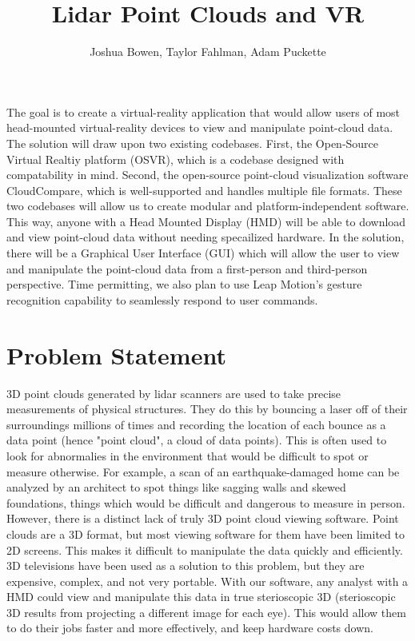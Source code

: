 \documentclass{article}
\begin{document}
\title{Lidar Point Clouds and VR}
\author{Joshua Bowen, Taylor Fahlman, Adam Puckette}

\maketitle

\abstract

The goal is to create a virtual-reality application that would allow users of most head-mounted virtual-reality devices to view and manipulate point-cloud data. The solution will draw upon two existing codebases. First, the Open-Source Virtual Realtiy platform (OSVR), which is a codebase designed with compatability in mind. Second, the open-source point-cloud visualization software CloudCompare, which is well-supported and handles multiple file formats. These two codebases will allow us to create modular and platform-independent software. This way, anyone with a Head Mounted Display (HMD) will be able to download and view point-cloud data without needing specailized hardware. In the solution, there will be a Graphical User Interface (GUI) which will allow the user to view and manipulate the point-cloud data from a first-person and third-person perspective. Time permitting, we also plan to use Leap Motion's gesture recognition capability to seamlessly respond to user commands.

\vfill
\section*{Problem Statement}

3D point clouds generated by lidar scanners are used to take precise measurements of physical structures. They do this by bouncing a laser off of their surroundings millions of times and recording the location of each bounce as a data point (hence "point cloud", a cloud of data points). This is often used to look for abnormalies in the environment that would be difficult to spot or measure otherwise. For example, a scan of an earthquake-damaged home can be analyzed by an architect to spot things like sagging walls and skewed foundations, things which would be difficult and dangerous to measure in person. However, there is a distinct lack of truly 3D point cloud viewing software. Point clouds are a 3D format, but most viewing software for them have been limited to 2D screens. This makes it difficult to manipulate the data quickly and efficiently. 3D televisions have been used as a solution to this problem, but they are expensive, complex, and not very portable. With our software, any analyst  with a HMD could view and manipulate this data in true sterioscopic 3D (sterioscopic 3D results from projecting a different image for each eye). This would allow them to do their jobs faster and more effectively, and keep hardware costs down. 
\end{document}
